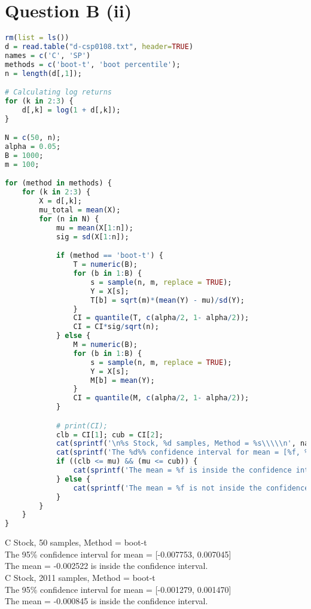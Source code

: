 \documentclass{article}
\begin{document}
\section{Question B (ii)}


\begin{lstlisting}[language=R]
rm(list = ls())
d = read.table("d-csp0108.txt", header=TRUE)
names = c('C', 'SP')
methods = c('boot-t', 'boot percentile');
n = length(d[,1]);

# Calculating log returns
for (k in 2:3) {
	d[,k] = log(1 + d[,k]);
}

N = c(50, n);
alpha = 0.05;
B = 1000;
m = 100;

for (method in methods) {
	for (k in 2:3) {
		X = d[,k];
		mu_total = mean(X);
		for (n in N) {
			mu = mean(X[1:n]);
			sig = sd(X[1:n]);

			if (method == 'boot-t') {
				T = numeric(B);
				for (b in 1:B) {
					s = sample(n, m, replace = TRUE);
					Y = X[s];
					T[b] = sqrt(m)*(mean(Y) - mu)/sd(Y);
				}
				CI = quantile(T, c(alpha/2, 1- alpha/2));
				CI = CI*sig/sqrt(n);
			} else {
				M = numeric(B);
				for (b in 1:B) {
					s = sample(n, m, replace = TRUE);
					Y = X[s];
					M[b] = mean(Y);
				}
				CI = quantile(M, c(alpha/2, 1- alpha/2));
			}

			# print(CI);
			clb = CI[1]; cub = CI[2];
			cat(sprintf('\n%s Stock, %d samples, Method = %s\\\\\n', names[k-1], n, method));
			cat(sprintf('The %d%% confidence interval for mean = [%f, %f]\\\\\n', 100*(1-alpha), clb, cub));
			if ((clb <= mu) && (mu <= cub)) {
				cat(sprintf('The mean = %f is inside the confidence interval.\\\\\n\n', mu));
			} else {
				cat(sprintf('The mean = %f is not inside the confidence interval.\\\\\n\n', mu));
			}
		}	
	}
}
\end{lstlisting}

C Stock, 50 samples, Method = boot-t\\
The 95\% confidence interval for mean = [-0.007753, 0.007045]\\
The mean = -0.002522 is inside the confidence interval.\\


C Stock, 2011 samples, Method = boot-t\\
The 95\% confidence interval for mean = [-0.001279, 0.001470]\\
The mean = -0.000845 is inside the confidence interval.\\
\end{document}
